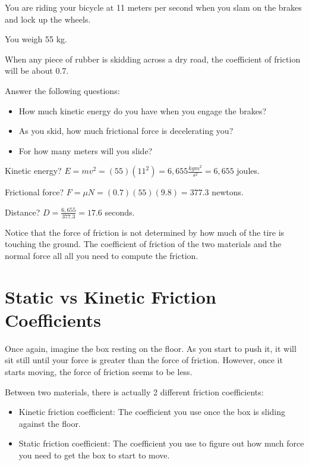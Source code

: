 \begin{Exercise}[title={Bicycle Stopping},  label=bike_stop]
  
You are riding your bicycle at 11 meters per second when you slam on the brakes and lock up the wheels.  

You weigh 55 kg.   

When any piece of rubber is skidding across a dry road,  the coefficient of friction will be about 0.7.

Answer the following questions: 

\begin{itemize}
\item How much kinetic energy do you have when you engage the brakes?
\item As you skid,  how much frictional force is decelerating you?
\item For how many meters will you slide?
\end{itemize}

\end{Exercise}
\begin{Answer}[ref=bike_stop]

Kinetic energy? $E = mv^2 = (55)(11^2) = 6,655 \frac{kg m^2}{s^2} = 6,655$ joules.

Frictional force? $F = \mu N = (0.7)(55)(9.8) = 377.3$ newtons.

Distance?  $D = \frac{6,655}{377.3} = 17.6$ seconds.

\end{Answer}

Notice that the force of friction is not determined by how much of the tire is touching the ground.  The coefficient of friction of the two materials and the normal force all all you need to compute the friction.

\section{Static vs Kinetic Friction Coefficients}

Once again, imagine the box resting on the floor.  As you start to push it,  it will sit still until your force is greater than the force of friction.   However, once it starts moving,  the force of friction seems to be less.

Between two materials,  there is actually 2 different friction coefficients:

\begin{itemize}
\item Kinetic friction coefficient:  The coefficient you use once the box is sliding against the floor.
\item Static friction coefficient: The coefficient you use to figure out how much force you need to get the box to start to move.
\end{itemize}

